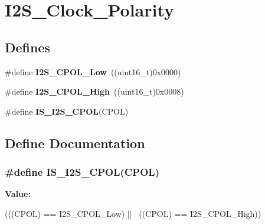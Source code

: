 \hypertarget{group__I2S__Clock__Polarity}{
\section{I2S\_\-Clock\_\-Polarity}
\label{group__I2S__Clock__Polarity}
}
\subsection*{Defines}
\begin{DoxyCompactItemize}
\item 
\hypertarget{group__I2S__Clock__Polarity_gae859a63575e4af3e007fc5123fa901ab}{
\#define {\bfseries I2S\_\-CPOL\_\-Low}~((uint16\_\-t)0x0000)}
\label{group__I2S__Clock__Polarity_gae859a63575e4af3e007fc5123fa901ab}

\item 
\hypertarget{group__I2S__Clock__Polarity_gae26f7f9fbde299fbdc0b81a2cc38bfdb}{
\#define {\bfseries I2S\_\-CPOL\_\-High}~((uint16\_\-t)0x0008)}
\label{group__I2S__Clock__Polarity_gae26f7f9fbde299fbdc0b81a2cc38bfdb}

\item 
\#define {\bfseries IS\_\-I2S\_\-CPOL}(CPOL)
\end{DoxyCompactItemize}


\subsection{Define Documentation}
\hypertarget{group__I2S__Clock__Polarity_ga6323375bf0b6fa6e2ee2a9ce6f9ef82f}{
\subsubsection[{IS\_\-I2S\_\-CPOL}]{\setlength{\rightskip}{0pt plus 5cm}\#define IS\_\-I2S\_\-CPOL(CPOL)}}
\label{group__I2S__Clock__Polarity_ga6323375bf0b6fa6e2ee2a9ce6f9ef82f}
{\bfseries Value:}
\begin{DoxyCode}
(((CPOL) == I2S_CPOL_Low) || \
                           ((CPOL) == I2S_CPOL_High))
\end{DoxyCode}
